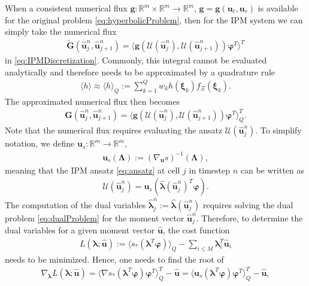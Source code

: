 When a consistent numerical flux $\bm g:\mathbb{R}^m\times\mathbb{R}^m\to\mathbb{R}^m$, $\bm g = \bm g(\bm u_\ell, \bm u_r)$ is available for the original problem \eqref{eq:hyperbolicProblem}, then for the IPM system we can simply take the numerical flux
\begin{align*}
 \bm{\tilde G}(\bm{\hat u}_{j}^n,\bm{\hat u}_{j+1}^{n}) = \langle \bm g(\mathcal{U}(\bm{\hat u}_j^n),\mathcal{U}(\bm{\hat u}_{j+1}^n))\bm{\varphi}^T\rangle^T
\end{align*}
in \eqref{eq:IPMDiscretization}. Commonly, this integral cannot be evaluated analytically and therefore needs to be approximated by a quadrature rule
\begin{align*}
\langle h \rangle \approx \langle h \rangle_{Q} := \sum_{k=1}^Q w_k h(\bm{\xi}_k)f_{\Xi}(\bm{\xi}_k).
\end{align*}
The approximated numerical flux then becomes
\begin{align}\label{eq:numericalFluxIPM}
 \bm{G}(\bm{\hat u}_{j}^n,\bm{\hat u}_{j+1}^{n}) = \langle \bm g(\mathcal{U}(\bm{\hat u}_j^n),\mathcal{U}(\bm{\hat u}_{j+1}^n))\bm{\varphi}^T\rangle^T_Q.
\end{align}
Note that the numerical flux requires evaluating the ansatz $\mathcal{U}(\bm{\hat u}_j^n)$. To simplify notation, we define $\bm{u}_{s}:\mathbb{R}^m \to \mathbb{R}^m$,
\begin{align*}
\bm{u}_{s}(\bm\Lambda):=\left( \nabla_{\bm{u}} s \right)^{-1}(\bm\Lambda),
\end{align*}
meaning that the IPM ansatz \eqref{eq:ansatz} at cell $j$ in timestep $n$ can be written as
\begin{align*}
\mathcal{U}(\bm{\hat u}_j^n) = \bm{u}_{s}(\bm{\hat{\lambda}}(\bm{\hat u}_j^n)^T \bm{\varphi}).
\end{align*}
The computation of the dual variables $\bm{\hat\lambda}_j^n:=\bm{\hat\lambda}(\bm{\hat u}_j^n)$ requires solving the dual problem \eqref{eq:dualProblem} for the moment vector $\bm{\hat u}_{j}^{n}$. Therefore, to determine the dual variables for a given moment vector $\bm{\hat{u}}$, the cost function
\begin{align}\label{eq:L}
L(\bm{\lambda};\bm{\hat{u}}) := \langle s_*(\bm{\lambda}^T \bm\varphi)\rangle_Q - \sum_{i\leq M}\bm{\lambda}_i^T \bm{\hat u}_i
\end{align}
needs to be minimized. Hence, one needs to find the root of
\begin{align*}
\nabla_{\bm{\lambda}}L(\bm{\lambda};\bm{\hat{u}}) = \langle \nabla s_*(\bm{\lambda}^T \bm\varphi)\bm\varphi^T\rangle_Q^T - \bm{\hat u} = \langle \bm u_s(\bm{\lambda}^T \bm\varphi)\bm\varphi^T\rangle_Q^T - \bm{\hat u},
\end{align*}
